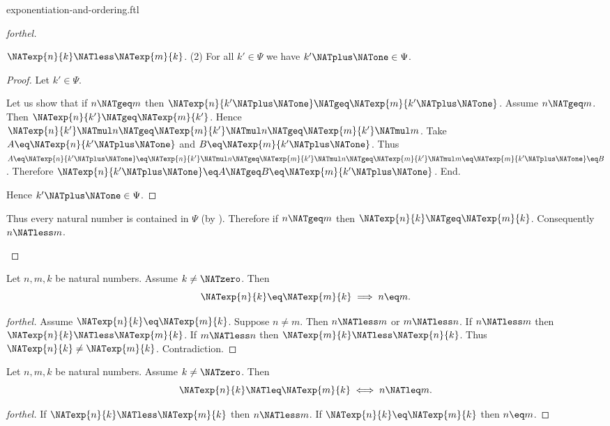 \documentclass{naproche-library}
\begin{document}
\begin{smodule}[title=Exponentiation and Ordering]{exponentiation-and-ordering.ftl}
\begin{proof}[forthel]
\begin{case}{$\NATexp{n}{k} \NATless \NATexp{m}{k}$.}
    (2) For all $k' \in \Psi$ we have $k' \NATplus \NATone \in \Psi$.
    \begin{proof}
      Let $k' \in \Psi$.

      Let us show that if $n \NATgeq m$ then $\NATexp{n}{k' \NATplus \NATone} \NATgeq \NATexp{m}{k' \NATplus \NATone}$.
        Assume $n \NATgeq m$.
        Then $\NATexp{n}{k'} \NATgeq \NATexp{m}{k'}$.
        Hence $\NATexp{n}{k'} \NATmul n \NATgeq \NATexp{m}{k'} \NATmul n \NATgeq \NATexp{m}{k'} \NATmul m$.
        Take $A \eq \NATexp{n}{k' \NATplus \NATone}$ and $B \eq \NATexp{m}{k' \NATplus \NATone}$. %
        Thus $A
          \eq \NATexp{n}{k' \NATplus \NATone}
          \eq \NATexp{n}{k'} \NATmul n
          \NATgeq \NATexp{m}{k'} \NATmul n
          \NATgeq \NATexp{m}{k'} \NATmul m
          \eq \NATexp{m}{k' \NATplus \NATone}
          \eq B$.
        Therefore $\NATexp{n}{k' \NATplus \NATone} \eq A \NATgeq B \eq \NATexp{m}{k' \NATplus \NATone}$.
      End.

      Hence $k' \NATplus \NATone \in \Psi$.
    \end{proof}

    Thus every natural number is contained in $\Psi$ (by ).
    Therefore if $n \NATgeq m$ then $\NATexp{n}{k} \NATgeq \NATexp{m}{k}$.
    Consequently $n \NATless m$.
  \end{case}
\end{proof}

\begin{corollary}[forthel,id=ARITHMETIC_09_2797602550579200]
  Let $n, m, k$ be natural numbers.
  Assume $k \neq \NATzero$.
  Then \[ \NATexp{n}{k} \eq \NATexp{m}{k} \implies n \eq m. \]
\end{corollary}
\begin{proof}[forthel]
  Assume $\NATexp{n}{k} \eq \NATexp{m}{k}$.
  Suppose $n \neq m$.
  Then $n \NATless m$ or $m \NATless n$.
  If $n \NATless m$ then $\NATexp{n}{k} \NATless \NATexp{m}{k}$.
  If $m \NATless n$ then $\NATexp{m}{k} \NATless \NATexp{n}{k}$.
  Thus $\NATexp{n}{k} \neq \NATexp{m}{k}$.
  Contradiction.
\end{proof}

\begin{corollary}[forthel,id=ARITHMETIC_09_6875081963732992]
  Let $n, m, k$ be natural numbers.
  Assume $k \neq \NATzero$.
  Then \[ \NATexp{n}{k} \NATleq \NATexp{m}{k} \iff n \NATleq m. \]
\end{corollary}
\begin{proof}[forthel]
  If $\NATexp{n}{k} \NATless \NATexp{m}{k}$ then $n \NATless m$.
  If $\NATexp{n}{k} \eq \NATexp{m}{k}$ then $n \eq m$.


\end{proof}
\end{smodule}
\end{document}

